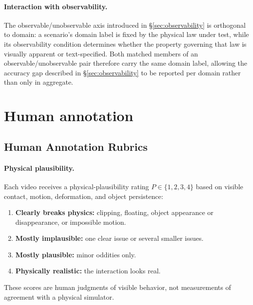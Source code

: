 \paragraph{Interaction with observability.} The observable/unobservable axis introduced in \S\ref{sec:observability} is orthogonal to domain: a scenario's domain label is fixed by the physical law under test, while its observability condition determines whether the property governing that law is visually apparent or text-specified. Both matched members of an observable/unobservable pair therefore carry the same domain label, allowing the accuracy gap described in \S\ref{sec:observability} to be reported per domain rather than only in aggregate.

\section{Human annotation}
\subsection{Human Annotation Rubrics}
\label{app:annotation-details}

\paragraph{Physical plausibility.}
Each video receives a physical-plausibility rating $P\in\{1,2,3,4\}$ based on visible contact, motion, deformation, and object persistence:
\begin{enumerate}
    \item \textbf{Clearly breaks physics:} clipping, floating, object appearance or disappearance, or impossible motion.
    \item \textbf{Mostly implausible:} one clear issue or several smaller issues.
    \item \textbf{Mostly plausible:} minor oddities only.
    \item \textbf{Physically realistic:} the interaction looks real.
\end{enumerate}
These scores are human judgments of visible behavior, not measurements of agreement with a physical simulator.

